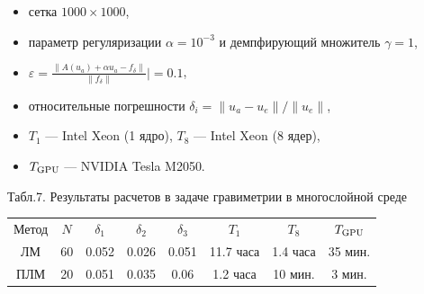 \documentclass[10pt,pdf, mathserif, hyperref={unicode}]{beamer}
\begin{document}
\begin{frame}
	\begin{itemize}
		\item сетка $1000\times1000$,
		\item параметр регуляризации $\alpha=10^{-3}$ и демпфирующий множитель $\gamma=1$,
		\item $\varepsilon=\frac{\|A(u_a)+\alpha u_a-f_\delta\|}{\|f_\delta\|}|=0.1$,
		\item относительные погрешности $\delta_i=\|u_a-u_e\|/\|u_e\|$,
		\item $T_1$ --- Intel Xeon (1 ядро), $T_8$ --- Intel Xeon (8 ядер),	
		\item $T_{\textup{GPU}}$ --- NVIDIA Tesla M2050.
	\end{itemize}
	\begin{table} 
		\centering
		\renewcommand{\arraystretch}{1.5} 
		{\scriptsize Табл.7. Результаты расчетов в задаче гравиметрии в многослойной среде}
		\small
\begin{tabular}{|c|c|c|c|c|c|c|c|}
\hline
\multirow{2}{*}{Метод} & \multirow{2}{*}{$N$} & \multirow{2}{*}{$\delta_1$} & \multirow{2}{*}{$\delta_2$} & \multirow{2}{*}{$\delta_3$} & \multirow{2}{*}{$T_1$} & \multirow{2}{*}{$T_8$} & \multirow{2}{*}{$T_{\textup{GPU}}$} \\
                       &                      &                             &                             &                             &                        &                        &                                     \\ \hline
ЛМ                     & 60                   & 0.052                       & 0.026                       & 0.051                       & 11.7 часа                & 1.4 часа                 & 35 мин.                             \\ \hline
\rowcolor{Green}
ПЛМ                    & 20                   & 0.051                       & 0.035                       & 0.06                        & 1.2 часа                 & 10 мин.                & 3 мин.                              \\ \hline
\end{tabular}
	\end{table}
\end{frame}
\end{document}
